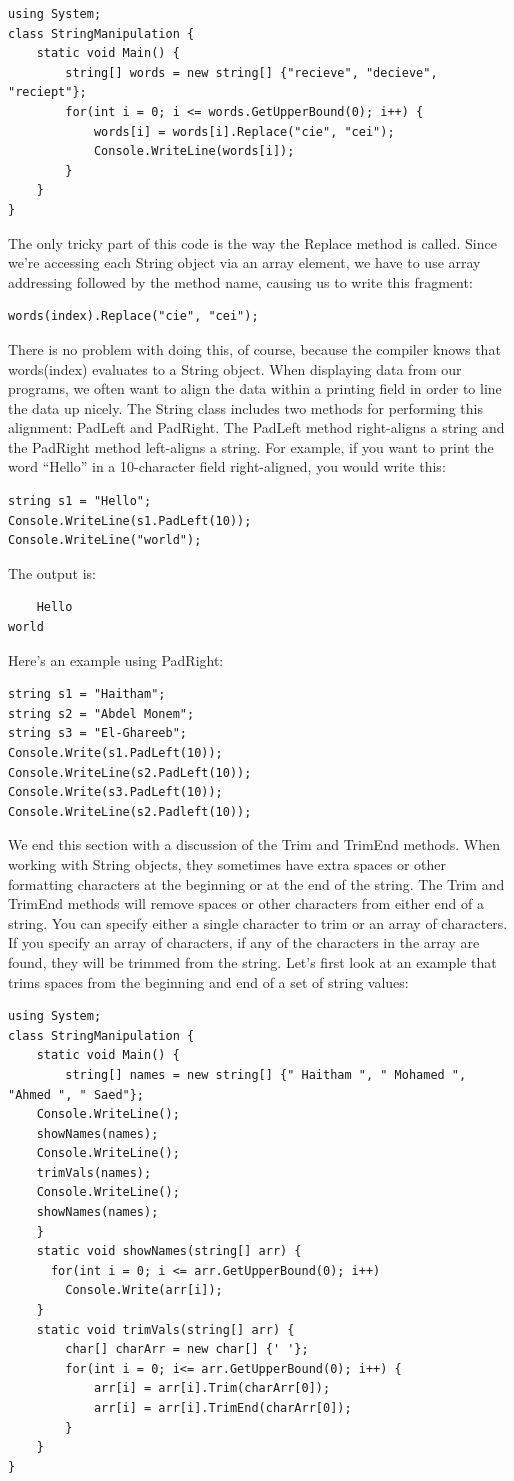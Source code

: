 \documentclass[12pt,a4paper,final,twoside,titlepage]{book}
\begin{document}
\begin{lstlisting}
using System; 
class StringManipulation {
	static void Main() {
		string[] words = new string[] {"recieve", "decieve", "reciept"};
		for(int i = 0; i <= words.GetUpperBound(0); i++) {
			words[i] = words[i].Replace("cie", "cei");
			Console.WriteLine(words[i]);
		} 
	}
}
\end{lstlisting}
The only tricky part of this code is the way the Replace method is called. Since we’re accessing each String object via an array element, we have to use array addressing followed by the method name, causing us to write this fragment:
\begin{lstlisting}
words(index).Replace("cie", "cei");
\end{lstlisting}
There is no problem with doing this, of course, because the compiler knows that words(index) evaluates to a String object.  When displaying data from our programs, we often want to align the data within a printing field in order to line the data up nicely. The String class includes two methods for performing this alignment: PadLeft and PadRight. The PadLeft method right-aligns a string and the PadRight method left-aligns a string. For example, if you want to print the word “Hello” in a 10-character field right-aligned, you would write this:
\begin{lstlisting}
string s1 = "Hello";
Console.WriteLine(s1.PadLeft(10));
Console.WriteLine("world");
\end{lstlisting}
The output is:
\begin{lstlisting}
	Hello 
world
\end{lstlisting}
Here’s an example using PadRight:
\begin{lstlisting}
string s1 = "Haitham";
string s2 = "Abdel Monem";
string s3 = "El-Ghareeb";
Console.Write(s1.PadLeft(10));
Console.WriteLine(s2.PadLeft(10));
Console.Write(s3.PadLeft(10));
Console.WriteLine(s2.Padleft(10));
\end{lstlisting}
We end this section with a discussion of the Trim and TrimEnd methods. When working with String objects, they sometimes have extra spaces or other formatting characters at the beginning or at the end of the string. The Trim and TrimEnd methods will remove spaces or other characters from either end of a string. You can specify either a single character to trim or an array of characters. If you specify an array of characters, if any of the characters in the array are found, they will be trimmed from the string. Let’s first look at an example that trims spaces from the beginning and end of a set of string values:
\begin{lstlisting}
using System; 
class StringManipulation {
	static void Main() {
		string[] names = new string[] {" Haitham ", " Mohamed ", "Ahmed ", " Saed"};
	Console.WriteLine();
	showNames(names);
	Console.WriteLine();
	trimVals(names);
	Console.WriteLine();
    showNames(names);
	}
	static void showNames(string[] arr) {
      for(int i = 0; i <= arr.GetUpperBound(0); i++)
        Console.Write(arr[i]);    
	}
	static void trimVals(string[] arr) {
		char[] charArr = new char[] {' '};
		for(int i = 0; i<= arr.GetUpperBound(0); i++) {
    		arr[i] = arr[i].Trim(charArr[0]);
    		arr[i] = arr[i].TrimEnd(charArr[0]);
    	}
    }
}
\end{lstlisting}
\end{document}
